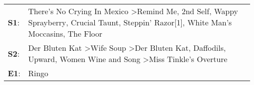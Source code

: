 \begin{supertabular}{p{0.03\textwidth}p{0.92\textwidth}}
 \textbf{S1}:  &  There's No Crying In Mexico\textsuperscript{} \textgreater \enspace Remind Me\textsuperscript{}, \enspace 2nd Self\textsuperscript{}, \enspace Wappy Sprayberry\textsuperscript{}, \enspace Crucial Taunt\textsuperscript{}, \enspace Steppin' Razor[1]\textsuperscript{}, \enspace White Man's Moccasins\textsuperscript{}, \enspace The Floor\textsuperscript{}  \enspace  \\
 \textbf{S2}:  &                                  Der Bluten Kat\textsuperscript{} \textgreater \enspace Wife Soup\textsuperscript{} \textgreater \enspace Der Bluten Kat\textsuperscript{}, \enspace Daffodils\textsuperscript{}, \enspace Upward\textsuperscript{}, \enspace Women Wine and Song\textsuperscript{} \textgreater \enspace Miss Tinkle's Overture\textsuperscript{}  \enspace  \\
 \textbf{E1}:  &                                                                                                                                                                                                                                                                                                                                            Ringo\textsuperscript{}  \enspace  \\
\end{supertabular}
